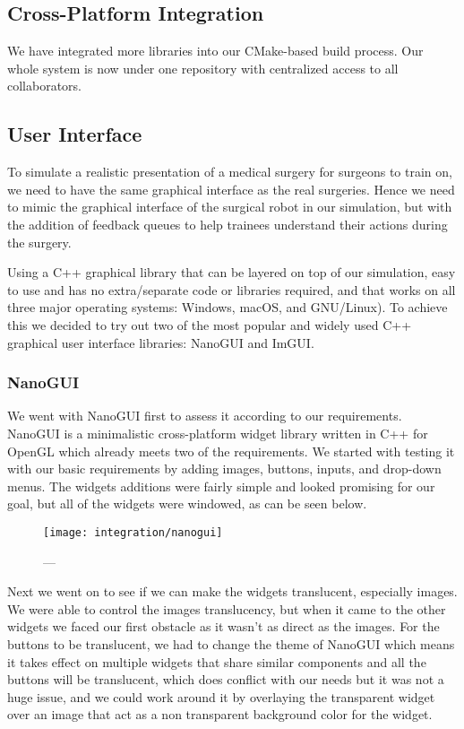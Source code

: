 \subsection{Cross-Platform Integration}
\label{sec:cross}

We have integrated more libraries into our CMake-based build process. Our whole system is now under one repository with centralized access to all collaborators.

\subsection{User Interface}
\label{sec:console}
To simulate a realistic presentation of a medical surgery for surgeons to train on, we need to have the same graphical interface as the real surgeries. Hence we need to mimic the graphical interface of the surgical robot in our simulation, but with the addition of feedback queues to help trainees understand their actions during the surgery.

Using a C++ graphical library that can be layered on top of our simulation, easy to use and has no extra/separate code or libraries required, and that works on all three major operating systems: Windows, macOS, and GNU/Linux). To achieve this we decided to try out two of the most popular and widely used C++ graphical user interface libraries: NanoGUI and ImGUI.

\subsubsection{NanoGUI}
\label{ssec:nanogui}
We went with NanoGUI first to assess it according to our requirements. NanoGUI is a minimalistic cross-platform widget library written in C++ for OpenGL which already meets two of the requirements. We started with testing it with our basic requirements by adding images, buttons, inputs, and drop-down menus. The widgets additions were fairly simple and looked promising for our goal, but all of the widgets were windowed, as can be seen below.

\begin{figure}
  \centering%
  \texttt{[image: integration/nanogui]}
  \caption{---}
  \label{fig:}
\end{figure}

Next we went on to see if we can make the widgets translucent, especially images. We were able to control the images translucency, but when it came to the other widgets we faced our first obstacle as it wasn’t as direct as the images. For the buttons to be translucent, we had to change the theme of NanoGUI which means it takes effect on multiple widgets that share similar components and all the buttons will be translucent, which does conflict with our needs but it was not a huge issue, and we could work around it by overlaying the transparent widget over an image that act as a non transparent background color for the widget.

